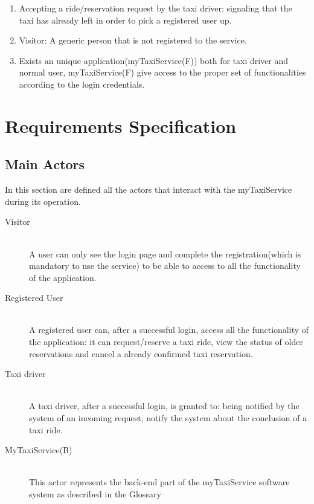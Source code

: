 \documentclass[11pt]{article} %
\begin{document}
\begin{enumerate}
        \item Accepting a ride/reservation request by the taxi driver: signaling that the taxi has already left in order to pick a registered user up.

        \item Visitor: A generic person that is not registered to the service.

        \item Exists an unique application(myTaxiService(F)) both for taxi driver and normal user, myTaxiService(F) give access to the proper set of functionalities
        according to the login credentials.
    \end{enumerate}

\section{Requirements Specification}
  \subsection{Main Actors}
    In this section are defined all the actors that interact with the myTaxiService during its operation.
    \begin{description}
      \item [Visitor] \hfill \\
          A user can only see the login page and complete the registration(which is mandatory to use the service)
          to be able to access to all the functionality of the application.

      \item [Registered User]\hfill \\
          A registered user can, after a successful login, access all the functionality of the application: it can
          request/reserve a taxi ride, view the status of older reservations and cancel a already confirmed taxi reservation.

      \item [Taxi driver] \hfill \\
          A taxi driver, after a successful login, is granted to: being notified by the system of an incoming request,
          notify the system about the conclusion of a taxi ride.

      \item [MyTaxiService(B)] \hfill \\
          This actor represents the back-end part of the myTaxiService software system as described in the Glossary
    \end{description}
\end{document}
